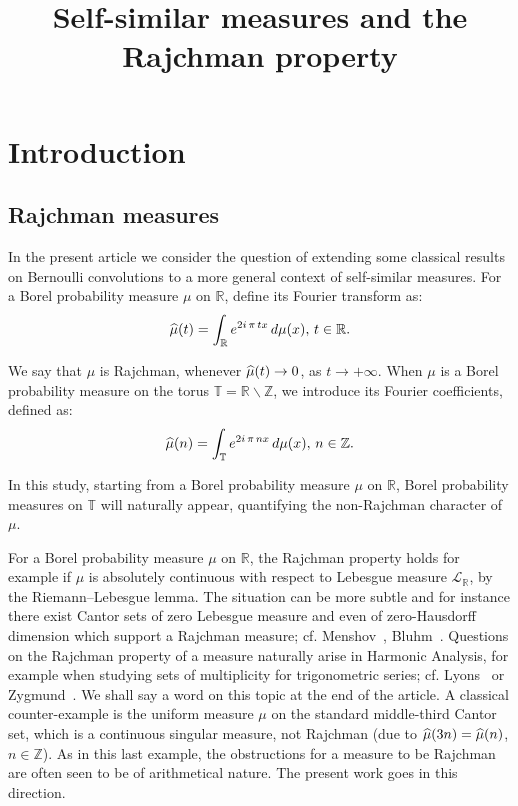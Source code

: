 \documentclass[AHL,Unicode,longabstracts,published]{cedram}
\title[Self-similar measures and the Rajchman property]{Self-similar measures and the Rajchman property}
\author[\initial{J.} \lastname{Brémont}]{\firstname{Julien} \lastname{Brémont}}
\newcommand{\Tbb}{\mathbb T}
\newcommand{\Rbb}{\mathbb R}
\newcommand{\Zbb}{\mathbb Z}
\newcommand{\Lcl}{\mathcal{L}}
\let\oldhat\hat
\renewcommand*{\hat}[1]{\mathchoice{\widehat{#1}}{\widehat{#1}}{\oldhat{#1}}{\oldhat{#1}}}
\begin{document}
\maketitle

\section{Introduction}

\subsection{Rajchman measures}
In the present article we consider the question of extending some classical results on Bernoulli convolutions to a more general context of self-similar measures. For a Borel probability measure $\mu$ on $\Rbb$, define its Fourier transform as:
\[
\hat{\mu}(t)=\int_{\Rbb}e^{2i\,\pi\,tx}\,d\mu(x),\,t\in\Rbb.
\]



We say that $\mu$ is Rajchman, whenever $\hat{\mu}(t)\rightarrow0$, as $t\rightarrow+\infty$. When $\mu$ is a Borel probability measure on the torus $\Tbb=\Rbb\backslash\Zbb$, we introduce its Fourier coefficients, defined as:
\[
\hat{\mu}(n)=\int_{\Tbb}e^{2i\,\pi\,nx}\,d\mu(x),\,n\in\Zbb.
\]


In this study, starting from a Borel probability measure $\mu$ on $\Rbb$, Borel probability measures on $\Tbb$ will naturally appear, quantifying the non-Rajchman character of $\mu$.


For a Borel probability measure $\mu$ on $\Rbb$, the Rajchman property holds for example if $\mu$ is absolutely continuous with respect to Lebesgue measure ${\Lcl}_{\Rbb}$, by the Riemann--Lebesgue lemma. The situation can be more subtle and for instance there exist Cantor sets of zero Lebesgue measure and even of zero-Hausdorff dimension which support a Rajchman measure; cf. Menshov~\cite{menshov}, Bluhm~\cite{bluhm}. Questions on the Rajchman property of a measure naturally arise in Harmonic Analysis, for example when studying sets of multiplicity for trigonometric series; cf. Lyons~\cite{seven} or Zygmund~\cite{zyg}. We shall say a word on this topic at the end of the article. A classical counter-example is the uniform measure $\mu$ on the standard middle-third Cantor set, which is a continuous singular measure, not Rajchman (due to $\hat{\mu}(3n)\linebreak=\hat{\mu}(n)$, $n\in\Zbb$). As in this last example, the obstructions for a measure to be Rajchman are often seen to be of arithmetical nature. The present work goes in this direction.
\end{document}
